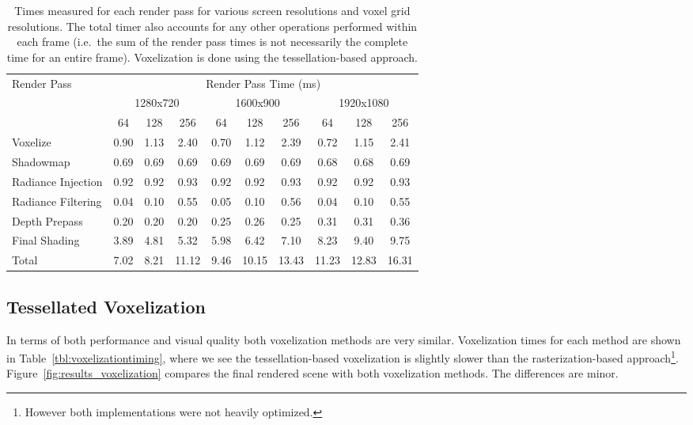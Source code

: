 \begin{table}[H]
\centering
\begin{tabular}{l ccc ccc ccc}
\toprule
Render Pass & \multicolumn{9}{c}{Render Pass Time (ms)} \\
& \multicolumn{3}{c}{1280x720} & \multicolumn{3}{c}{1600x900} & \multicolumn{3}{c}{1920x1080} \\
& 64 & 128 & 256 & 64 & 128 & 256 & 64 & 128 & 256 \\
\midrule
Voxelize           & 0.90 & 1.13 & 2.40  & 0.70 & 1.12 & 2.39  & 0.72 & 1.15 & 2.41\\
Shadowmap          & 0.69 & 0.69 & 0.69  & 0.69 & 0.69 & 0.69  & 0.68 & 0.68 & 0.69\\
Radiance Injection & 0.92 & 0.92 & 0.93  & 0.92 & 0.92 & 0.93  & 0.92 & 0.92 & 0.93\\
Radiance Filtering & 0.04 & 0.10 & 0.55  & 0.05 & 0.10 & 0.56  & 0.04 & 0.10 & 0.55\\
Depth Prepass      & 0.20 & 0.20 & 0.20  & 0.25 & 0.26 & 0.25  & 0.31 & 0.31 & 0.36\\
Final Shading      & 3.89 & 4.81 & 5.32  & 5.98 & 6.42 & 7.10  & 8.23 & 9.40 & 9.75\\
\midrule
Total              & 7.02 & 8.21 & 11.12  & 9.46 & 10.15 & 13.43  & 11.23 & 12.83 & 16.31\\
\bottomrule
\end{tabular}
\caption{Times measured for each render pass for various screen resolutions and voxel grid resolutions. The total timer also accounts for any other operations performed within each frame (i.e.\ the sum of the render pass times is not necessarily the complete time for an entire frame). Voxelization is done using the tessellation-based approach.}
\label{tbl:renderpasstiming}
\end{table}

\subsection{Tessellated Voxelization}
In terms of both performance and visual quality both voxelization methods are very similar. Voxelization times for each method are shown in Table~\ref{tbl:voxelizationtiming}, where we see the tessellation-based voxelization is slightly slower than the rasterization-based approach\footnote{However both implementations were not heavily optimized.}. Figure~\ref{fig:results_voxelization} compares the final rendered scene with both voxelization methods. The differences are minor.

